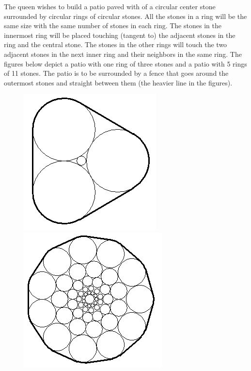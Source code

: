 
The queen wishes to build a patio paved with of a circular center stone
surrounded by circular rings of circular stones.  All the stones in a
ring will be the same size with the same number of stones in each ring.
The stones in the innermost ring will be placed touching (tangent to)
the adjacent stones in the ring and the central stone.  The stones in
the other rings will touch the two adjacent stones in the next inner ring
and their neighbors in the same ring.  The figures below depict a patio
with one ring of three stones and a patio with 5 rings of 11 stones.
The patio is to be surrounded by a fence that goes around the outermost
stones and straight between them (the heavier line in the figures).

\begin{figure}[!h]
    \begin{center}
        \includegraphics[]{i1.png} 
        \includegraphics[]{i2.png} \\ 
    \end{center}
\end{figure}

